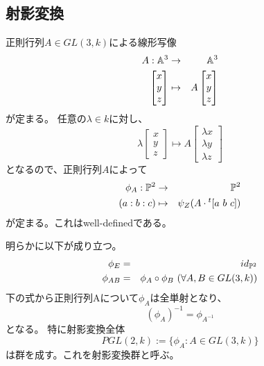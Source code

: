 \documentclass[a4paper]{jsarticle}
\begin{document}
\subsection{射影変換}
正則行列$A \in GL(3, k)$による線形写像
\begin{eqnarray*}
    A : \mathbb{A}^3 &\to& \mathbb{A}^3 \\
    \begin{bmatrix}
        x \\ y \\ z
    \end{bmatrix}
    &\mapsto&
    A
    \begin{bmatrix}
        x \\ y \\ z
    \end{bmatrix}
\end{eqnarray*}
が定まる。
任意の$\lambda  \in k$に対し、
\[
    \lambda
    \begin{bmatrix}
        x \\ y \\ z
    \end{bmatrix}
    \mapsto
    A
    \begin{bmatrix}
        \lambda x \\ \lambda y \\ \lambda z
    \end{bmatrix}
\]
となるので、正則行列$A$によって
\begin{eqnarray*}
    \phi_{A} : \mathbb{P}^2 &\to& \mathbb{P}^2 \\
    (a:b:c) &\mapsto& \psi_{Z}(A \cdot {}^t[a~b~c])
\end{eqnarray*}
が定まる。これはwell-definedである。

明らかに以下が成り立つ。
\begin{eqnarray*}
    \phi_{E} &=& id_{\mathbb{P}^2} \\
    \phi_{AB} &=& \phi_{A} \circ \phi_{B} ~(\forall A, B \in GL(3,k))
\end{eqnarray*}
下の式から正則行列Aについて$\phi_A$は全単射となり、
\[ (\phi_A)^{-1}=\phi_{A^{-1}} \]となる。
特に射影変換全体
\[ PGL(2, k):=\{ \phi_A : A \in GL(3,k) \} \]
は群を成す。これを射影変換群と呼ぶ。
\end{document}
